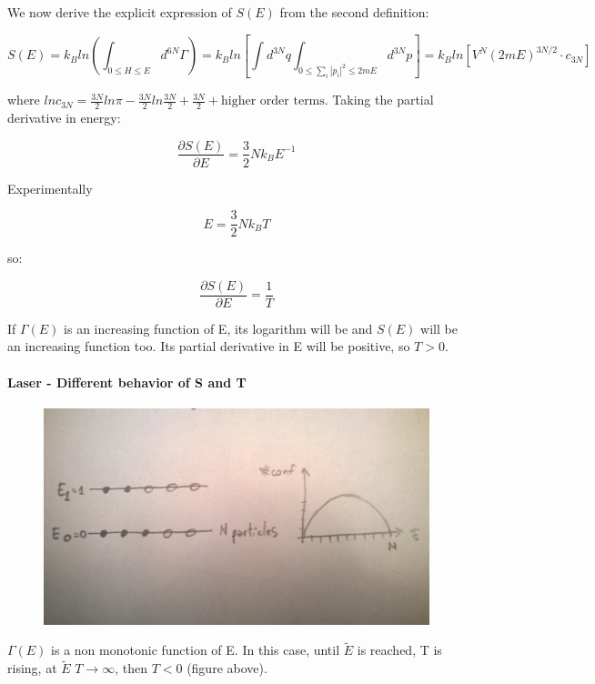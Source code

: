 \documentclass[a4paper, italian, openany]{book}
\begin{document}
We now derive the explicit expression of $S(E)$ from the second definition:

$$S(E) = k_B ln(\int_{0 \le H \le E}d^{6N}\Gamma) = k_B ln \left [ \int d^{3N}q \int_{0 \le \sum_i |p_i|^2 \le 2mE} d^{3N}p \right ] = k_B ln \left [ V^N (2mE)^{3N/2} \cdot c_{3N} \right ]$$

where $lnc_{3N} = \frac{3N}{2} ln\pi - \frac{3N}{2} ln \frac{3N}{2} + \frac{3N}{2} + \mbox{higher order terms}$.\newline 
Taking the partial derivative in energy:

$$\frac{\partial S(E)}{\partial E} = \frac{3}{2} N k_B E^{-1}$$

Experimentally 

$$E = \frac{3}{2} N k_B T$$

so:

$$\frac{\partial S(E)}{\partial E} = \frac{1}{T}$$

If $\Gamma(E)$ is an increasing function of E, its logarithm will be and $S(E)$ will be an increasing function too.\newline 
Its partial derivative in E will be positive, so $T > 0$.

\paragraph{Laser - Different behavior of S and T}

\begin{figure}[H]
\centering
\includegraphics[width=140mm]{img/figure7.jpg}
\end{figure}

$\Gamma (E)$ is a non monotonic function of E. In this case, until $\tilde{E}$ is reached, T is rising, at $\tilde{E}$ $T \to \infty$, then $T<0$ (figure above).
\end{document}
